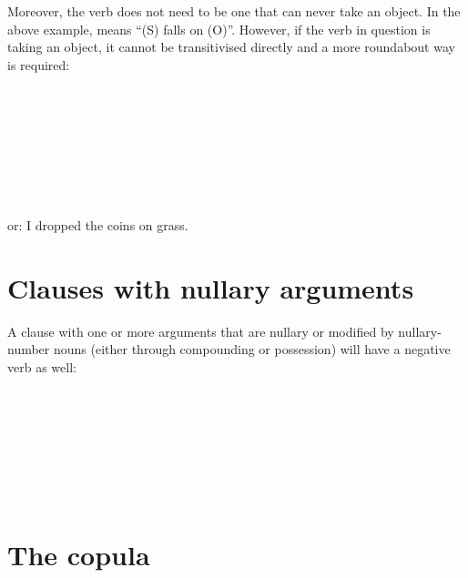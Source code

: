 \documentclass{book}
\begin{document}
Moreover, the verb does not need to be one that can never take an object. In the above example,  means ``(S) falls on (O)''. However, if the verb in question is taking an object, it cannot be transitivised directly and a more roundabout way is required: \\
~\\
 \\
   \\
   \\
~\\
 \\
     \\
     \\
or: I dropped the coins on grass.

\section{Clauses with nullary arguments}

A clause with one or more arguments that are nullary or modified by nullary-number nouns (either through compounding or possession) will have a negative verb as well: \\
~\\
 \\
  \\
  \\
~\\
 \\
     \\
    

\section{The copula}
\end{document}
